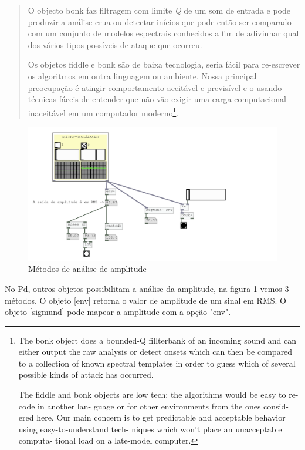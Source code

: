 \documentclass{ppgmus}
\begin{document}
\begin{quote}
O objecto bonk faz filtragem com limite \textit{Q} de um som de entrada e
pode produzir a análise crua ou detectar inícios
que pode então ser comparado com um conjunto de modelos espectrais conhecidos
a fim de adivinhar qual dos vários
tipos possíveis de ataque que ocorreu.

Os objetos fiddle e bonk são de baixa tecnologia, seria fácil para re-escrever os
algoritmos  em outra linguagem
 ou ambiente. Nossa principal preocupação é atingir comportamento aceitável e previsível e
 o usando técnicas fáceis de entender que não vão exigir uma carga computacional inaceitável
 em um computador moderno\footnote{The bonk object does a bounded-Q fillterbank of an incoming sound and
can either output the raw analysis or detect onsets
which can then be compared to a collection of known
spectral templates in order to guess which of several
possible kinds of attack has occurred.

The fiddle and bonk objects are low tech; the
algorithms would be easy to re-code in another lan-
guage or for other environments from the ones consid-
ered here. Our main concern is to get predictable and
acceptable behavior using easy-to-understand tech-
niques which won't place an unacceptable computa-
tional load on a late-model computer.}. \cite{bonk}
 
\end{quote}

\begin{figure}
\includegraphics[scale=.5]{bonks}
\caption{Métodos de análise de amplitude}
\label{bonks} 
\end{figure}


No Pd, outros objetos possibilitam a análise da amplitude,
na figura \ref{bonks} vemos 3 métodos. O objeto [env\texttildelow]
retorna o valor de amplitude de um sinal em RMS. O objeto
[sigmund\texttildelow] pode mapear a amplitude com a opção
"env".
\end{document}
